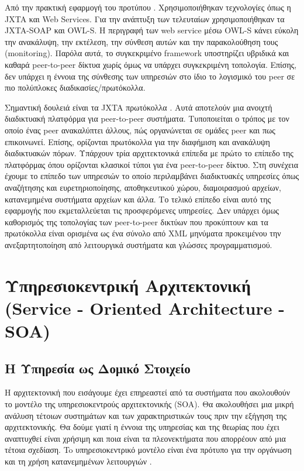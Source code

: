 Από την πρακτική εφαρμογή του προτύπου \citep{Amoretti2005SP2A}. 
Χρησιμοποιήθηκαν τεχνολογίες όπως η JXTA και Web Services. Για την ανάπτυξη 
των τελευταίων χρησιμοποιήθηκαν τα JXTA-SOAP και OWL-S. Η περιγραφή των web 
service μέσω OWL-S κάνει εύκολη την ανακάλυψη, την εκτέλεση, την σύνθεση 
αυτών και την παρακολούθηση τους (monitoring). Παρόλα αυτά, το συγκεκριμένο 
framework υποστηρίζει υβριδικά και καθαρά peer-to-peer δίκτυα χωρίς όμως να 
υπάρχει συγκεκριμένη τοπολογία. Επίσης, δεν υπάρχει η έννοια της 
σύνθεσης των υπηρεσιών στο ίδιο το λογισμικό του peer σε πιο πολύπλοκες 
διαδικασίες/πρωτόκολλα.

Σημαντική δουλειά είναι τα JXTA πρωτόκολλα \citep{JXTA2007}. Αυτά 
αποτελούν μια ανοιχτή διαδικτυακή πλατφόρμα για peer-to-peer συστήματα. 
Τυποποιείται ο τρόπος με τον οποίο ένας peer ανακαλύπτει άλλους, πώς 
οργανώνεται σε ομάδες peer και πως επικοινωνεί. Επίσης, ορίζονται 
πρωτόκολλα για την διαφήμιση και ανακάλυψη διαδικτυακών πόρων. Υπάρχουν 
τρία αρχιτεκτονικά επίπεδα με πρώτο το επίπεδο της πλατφόρμας όπου 
ορίζονται κλασικοί τύποι για ένα peer-to-peer δίκτυο. Στη συνέχεια 
έχουμε το επίπεδο των υπηρεσιών το οποίο περιλαμβάνει διαδικτυακές 
υπηρεσίες όπως αναζήτησης και ευρετηριοποίησης, αποθηκευτικού χώρου, 
διαμοιρασμού αρχείων, κατανεμημένα συστήματα αρχείων και άλλα. Το τελικό 
επίπεδο είναι αυτό της εφαρμογής που εκμεταλλεύεται τις προσφερόμενες 
υπηρεσίες. Δεν υπάρχει όμως καθορισμός της τοπολογίας των peer-to-peer 
δικτύων που προκύπτουν και τα πρωτόκολλα είναι ορισμένα ως ένα σύνολο 
από XML μηνύματα προκειμένου την ανεξαρτητοποίηση από λειτουργικά 
συστήματα και γλώσσες προγραμματισμού.

\section[Υπηρεσιοκεντρική Αρχιτεκτονική]{Υπηρεσιοκεντρική Αρχιτεκτονική (Service - Oriented Architecture - SOA)}
\label{sec:SOA}

\subsection{Η Υπηρεσία ως Δομικό Στοιχείο}

Η αρχιτεκτονική που εισάγουμε έχει επηρεαστεί από τα συστήματα που 
ακολουθούν το μοντέλο της υπηρεσιοκεντρούς αρχιτεκτονικής (SOA). Θα 
ακολουθήσει μια μικρή ανάλυση τέτοιων συστημάτων και των χαρακτηριστικών 
τους πριν την εξήγηση της αρχιτεκτονικής. Θα δούμε γιατί η έννοια της 
υπηρεσίας και της θεωρίας που έχει αναπτυχθεί είναι χρήσιμη και ποια 
είναι τα πλεονεκτήματα που απορρέουν από μια τέτοια σχεδίαση. To 
υπηρεσιοκεντρικό μοντέλο είναι ένα πρότυπο για την οργάνωση και τη χρήση 
κατανεμημένων λειτουργιών \citep{OASIS-soa-rm}. 

